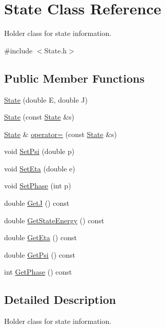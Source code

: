 \hypertarget{classState}{\section{State Class Reference}
\label{classState}
}


Holder class for state information.  




{\ttfamily \#include $<$State.\-h$>$}

\subsection*{Public Member Functions}
\begin{DoxyCompactItemize}
\item 
\hyperlink{classState_a06762f18825189d2a4989032e0dc3221}{State} (double E, double J)
\item 
\hyperlink{classState_a42ff89d16d3480c356d1cf00ce85342a}{State} (const \hyperlink{classState}{State} \&s)
\item 
\hyperlink{classState}{State} \& \hyperlink{classState_a22116d79ea23af902edf470de6308d11}{operator=} (const \hyperlink{classState}{State} \&s)
\item 
void \hyperlink{classState_af9327320b85b0346608095099dbcc3df}{Set\-Psi} (double p)
\item 
void \hyperlink{classState_a70d9a5247aac1ddd41a6807077592cae}{Set\-Eta} (double e)
\item 
void \hyperlink{classState_a191bed7513e32f0882ea4efd7f131209}{Set\-Phase} (int p)
\item 
double \hyperlink{classState_a1f71fa7f455524e50c49623f9b8ccd28}{Get\-J} () const 
\item 
double \hyperlink{classState_a63e6f0dddee6794b23d2c0c50427f9cc}{Get\-State\-Energy} () const 
\item 
double \hyperlink{classState_a19ccbecb81b883362d8b5add5fccd2af}{Get\-Eta} () const 
\item 
double \hyperlink{classState_afe099aeeef5a233f9b2a9cd2b9d37080}{Get\-Psi} () const 
\item 
int \hyperlink{classState_afa9487319bba788836d50618cff9261a}{Get\-Phase} () const 
\end{DoxyCompactItemize}


\subsection{Detailed Description}
Holder class for state information. 

